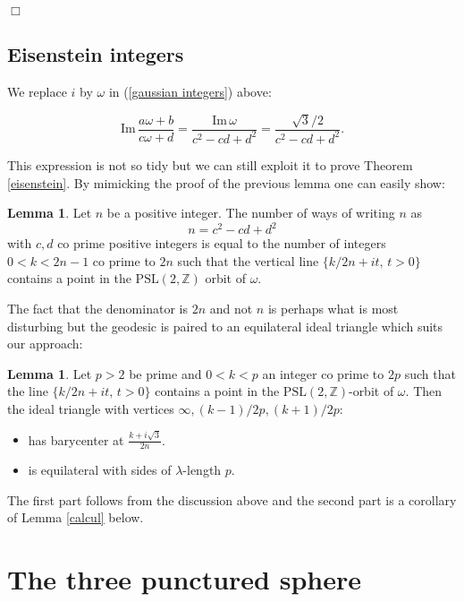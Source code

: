\documentclass[12pt]{amsart}
\theoremstyle{plain}
\theoremstyle{definition}
\newtheorem{lem}[thm]{Lemma}
\def\im{\mathrm{Im}\,}
\def\ZZ{\mathbb{Z}}
\def\sl2{\mathrm{PSL}(2, \ZZ)}
\begin{document}
\hfill $\Box$

\subsection{Eisenstein integers}

We replace $i$ by $\omega$ in (\ref{gaussian integers}) above:

\begin{equation}
\label{eisen  integers}
 \im  \frac{a \omega +b}{c \omega+d }
= \frac{\im \omega} {c^2  - cd  + d^2} 
= \frac{\sqrt{3}/2} {c^2  - cd  + d^2}.
\end{equation}

This expression is not so tidy but we can still exploit it 
to prove Theorem \ref{eisenstein}. 
By mimicking the proof of the previous lemma 
one can easily show:


\begin{lem} \label{cubes}
Let $n$ be a positive integer.
The number of  ways of writing $n$  as 
$$n = c^2  - cd  + d^2$$
with $c,d$ co prime positive  integers
is equal to the number of  integers $0 < k < 2n-1$ co prime to $2n$
such that the vertical line
$\{  k/2n + i t,\, t >0 \}$
contains  a point in the $\sl2$  orbit of $\omega$.
\end{lem}

The fact that the denominator is $2n$ and not $n$ 
is perhaps what is most disturbing but
 the geodesic is paired to an equilateral ideal triangle
which suits our approach:

\begin{lem} \label{cubes}
Let $p>2$ be prime and $0 < k < p$ an integer 
co prime to $2p$ such that the line $\{  k/2n + i t,\, t >0 \}$
contains  a point in the $\sl2$-orbit of $\omega$.
Then the ideal triangle 
with vertices $\infty, (k-1)/2p, (k+1)/2p$:
\begin{itemize}
\item has barycenter at $\frac{ k + i \sqrt{3}}{2n}$.
\item is equilateral  with sides of $\lambda$-length $p$.
\end{itemize}
\end{lem}

The  first part follows from the discussion above and the
second part is a corollary of  Lemma \ref{calcul} below. 



\section{The three punctured sphere}
\end{document}
